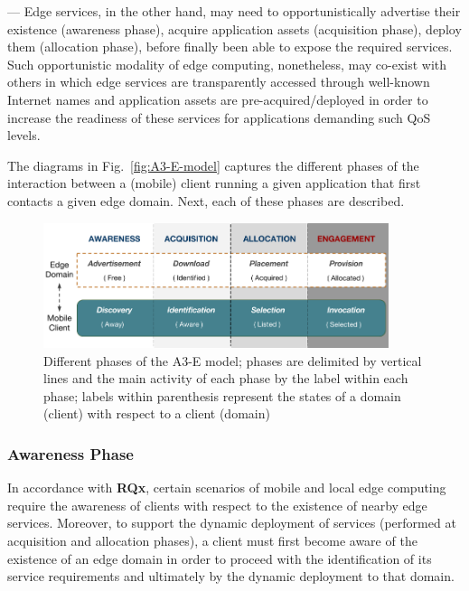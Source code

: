 --- Edge services, in the other hand, may need to opportunistically advertise their existence (awareness phase), acquire application assets (acquisition phase), deploy them (allocation phase), before finally been able to expose the required services. Such opportunistic modality of edge computing, nonetheless, may co-exist with others in which edge services are transparently accessed through well-known Internet names and application assets are pre-acquired/deployed in order to increase the readiness of these services for applications demanding such QoS levels. 



The diagrams in Fig.~\ref{fig:A3-E-model} captures the different phases of the interaction between a (mobile) client running a given application that first contacts a given edge domain. Next, each of these phases are described.

\begin{figure}
	\includegraphics[width=0.9\textwidth]{figs/A3-E.png}
	\caption{Different phases of the A3-E model; phases are delimited by vertical lines and the main activity of each phase by the label within each phase; labels within parenthesis represent the states of a domain (client) with respect to a client (domain)}
	\label{fig:A3-E-phases}
\end{figure}

\subsubsection{Awareness Phase}\label{sec:A3-E-awareness}

In accordance with \textbf{RQx}, certain scenarios of mobile and local edge computing require the awareness of clients with respect to the existence of nearby edge services. Moreover, to support the dynamic deployment of services (performed at acquisition and allocation phases), a client must first become aware of the existence of an edge domain in order to proceed with the identification of its service requirements and ultimately by the dynamic deployment to that domain. 

